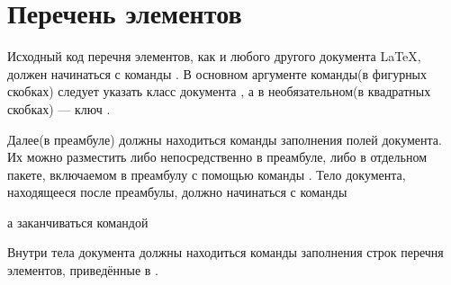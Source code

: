 
\section{Перечень элементов}

Исходный код перечня элементов, как и любого другого документа \LaTeX{}, должен
начинаться с команды . В основном аргументе
команды(в фигурных скобках) следует указать класс документа , а в
необязательном(в квадратных скобках) --- ключ .


Далее(в преамбуле) должны находиться команды заполнения полей документа. Их можно
разместить либо непосредственно в преамбуле, либо в отдельном пакете, включаемом в
преамбулу с помощью команды . Тело документа,
находящееся после преамбулы, должно начинаться с команды

\begin{pcbdoccode}

\end{pcbdoccode}

а заканчиваться командой

\begin{pcbdoccode}

\end{pcbdoccode}

%
%
%

Внутри тела документа должны находиться команды заполнения строк
перечня элементов, приведённые в .\newpage


